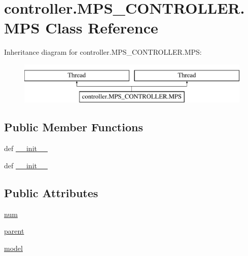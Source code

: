 \hypertarget{classcontroller_1_1MPS__CONTROLLER_1_1MPS}{}\section{controller.\+M\+P\+S\+\_\+\+C\+O\+N\+T\+R\+O\+L\+L\+E\+R.\+M\+P\+S Class Reference}
\label{classcontroller_1_1MPS__CONTROLLER_1_1MPS}
Inheritance diagram for controller.\+M\+P\+S\+\_\+\+C\+O\+N\+T\+R\+O\+L\+L\+E\+R.\+M\+P\+S\+:\begin{figure}[H]
\begin{center}
\leavevmode
\includegraphics[height=2.000000cm]{classcontroller_1_1MPS__CONTROLLER_1_1MPS}
\end{center}
\end{figure}
\subsection*{Public Member Functions}
\begin{DoxyCompactItemize}
\item 
def \hyperlink{classcontroller_1_1MPS__CONTROLLER_1_1MPS_a1d1173e338a822b9fb79f2729a5b22d6}{\+\_\+\+\_\+init\+\_\+\+\_\+}
\item 
def \hyperlink{classcontroller_1_1MPS__CONTROLLER_1_1MPS_a1d1173e338a822b9fb79f2729a5b22d6}{\+\_\+\+\_\+init\+\_\+\+\_\+}
\end{DoxyCompactItemize}
\subsection*{Public Attributes}
\begin{DoxyCompactItemize}
\item 
\hyperlink{classcontroller_1_1MPS__CONTROLLER_1_1MPS_a9de44ffe2a85ef6e94382e4cd83edbf4}{num}
\item 
\hyperlink{classcontroller_1_1MPS__CONTROLLER_1_1MPS_a1f68071cc37bb25d2118c03d7c6053de}{parent}
\item 
\hyperlink{classcontroller_1_1MPS__CONTROLLER_1_1MPS_ac4d5522cfd6410de5479c5adaa69445d}{model}
\end{DoxyCompactItemize}


